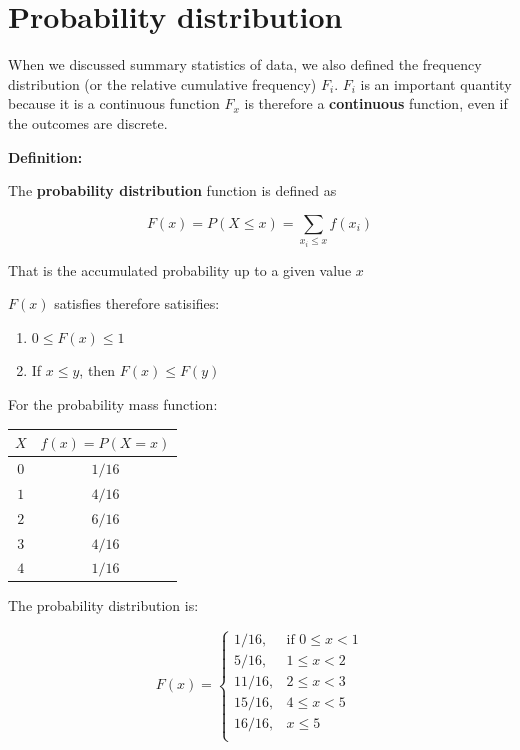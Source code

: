 \documentclass[
]{book}
\providecommand{\tightlist}{%
  \setlength{\itemsep}{0pt}\setlength{\parskip}{0pt}}
\begin{document}
\hypertarget{probability-distribution}{%
\section{Probability distribution}\label{probability-distribution}}

When we discussed summary statistics of data, we also defined the frequency distribution (or the relative cumulative frequency) \(F_i\). \(F_i\) is an important quantity because it is a continuous function \(F_x\) is therefore a \textbf{continuous} function, even if the outcomes are discrete.

\textbf{Definition:}

The \textbf{probability distribution} function is defined as

\[F(x)=P(X\leq x)=\sum_{x_i\leq x} f(x_i) \]

That is the accumulated probability up to a given value \(x\)

\(F(x)\) satisfies therefore satisifies:

\begin{enumerate}
\def\labelenumi{\arabic{enumi})}
\tightlist
\item
  \(0\leq F(x) \leq 1\)
\item
  If \(x \leq y\), then \(F(x) \leq F(y)\)
\end{enumerate}

For the probability mass function:

\begin{longtable}[]{@{}cc@{}}
\toprule
\(X\) & \(f(x)=P(X=x)\) \\
\midrule
\endhead
\(0\) & \(1/16\) \\
\(1\) & \(4/16\) \\
\(2\) & \(6/16\) \\
\(3\) & \(4/16\) \\
\(4\) & \(1/16\) \\
\bottomrule
\end{longtable}

The probability distribution is:

\[
    F(x)=
\begin{cases}
    1/16,& \text{if } 0 \leq x < 1\\
    5/16,& 1\leq x < 2\\
    11/16,& 2\leq x < 3\\
    15/16,& 4\leq x < 5\\
    16/16,&  x \leq 5\\
\end{cases}
\]
\end{document}
